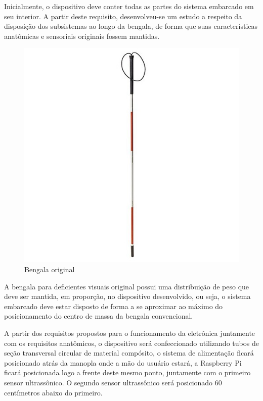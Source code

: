 Inicialmente, o dispositivo deve conter todas as partes do sistema embarcado em seu interior. A partir deste requisito, desenvolveu-se um estudo a respeito da disposição dos subsistemas ao longo da bengala, de forma que suas características anatômicas e sensoriais originais fossem mantidas.

\begin{figure}[H]
\includegraphics[scale=2]{figuras/bengala/bengala.jpg}
\centering
\caption{Bengala original}
\label{fig:sensor.jpg}
\end{figure}

A bengala para deficientes visuais original possui uma distribuição de peso que deve ser mantida, em proporção, no dispositivo desenvolvido, ou seja, o sistema embarcado deve estar disposto de forma a se aproximar ao máximo do posicionamento do centro de massa da bengala convencional.

A partir dos requisitos propostos para o funcionamento da eletrônica juntamente com os requisitos anatômicos, o dispositivo será confeccionado utilizando tubos de seção transversal circular de material compósito, o sistema de alimentação ficará posicionado atrás da manopla onde a mão do usuário estará, a Raspberry Pi ficará posicionada logo a frente deste mesmo ponto, juntamente com o primeiro sensor ultrassônico. O segundo sensor ultrassônico será posicionado 60 centímetros abaixo do primeiro.

